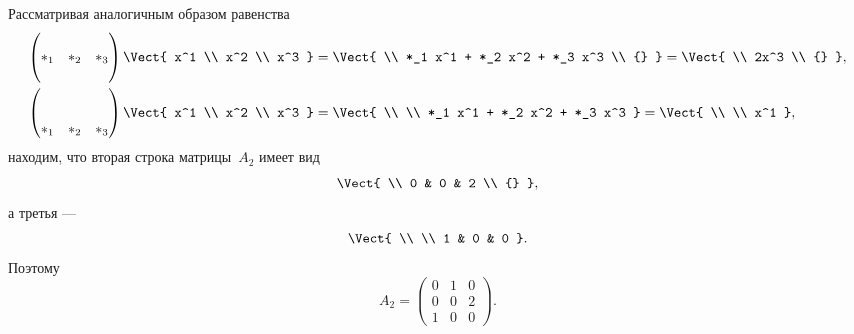 \begin{proofm}
	Рассматривая аналогичным образом равенства
	\begin{align*}
		\begin{pmatrix}
			\\
			*_1 & *_2 & *_3
			\\
			{}
		\end{pmatrix}
		\Vect{
			x^1 \\ x^2 \\ x^3
		}
		&=
		\Vect{
			\\
			*_1 x^1 + *_2 x^2 + *_3 x^3
			\\
			{}
		}
		=
		\Vect{
			\\
			2x^3
			\\
			{}
		}
		,
		\\
		\begin{pmatrix}
			\\
			\\
			*_1 & *_2 & *_3
		\end{pmatrix}
		\Vect{
			x^1 \\ x^2 \\ x^3
		}
		&=
		\Vect{
			\\
			\\
			*_1 x^1 + *_2 x^2 + *_3 x^3
		}
		=
		\Vect{
			\\
			\\
			x^1
		}
		,
	\end{align*}
	находим, что вторая строка матрицы~$A_2$ имеет вид
	\[
		\Vect{
			\\
			0 & 0 & 2
			\\
			{}
		},
	\]
	а третья ---
	\[
		\Vect{
			\\
			\\
			1 & 0 & 0
		}.
	\]
	Поэтому
	\[
		A_2 =
		\begin{pmatrix}
			0 & 1 & 0
			\\
			0 & 0 & 2
			\\
			1 & 0 & 0
		\end{pmatrix}
		.
	\]


\end{proofm}
